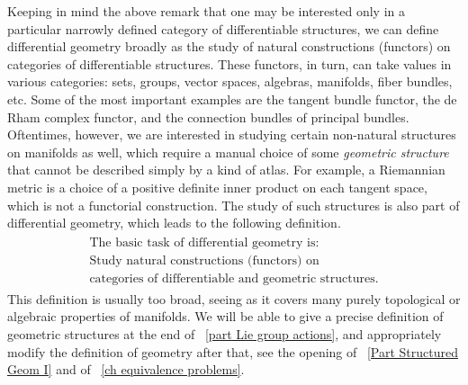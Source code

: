 Keeping in mind the above remark that one may be interested only in a particular narrowly defined category of differentiable structures, we can define differential geometry broadly as the study of natural constructions (functors) on categories of differentiable structures. These functors, in turn, can take values in various categories: sets, groups, vector spaces, algebras, manifolds, fiber bundles, etc. Some of the most important examples are the tangent bundle functor, the de Rham complex functor, and the connection bundles of principal bundles. Oftentimes, however, we are interested in studying certain non-natural structures on manifolds as well, which require a manual choice of some \emph{geometric structure} that cannot be described simply by a kind of atlas. For example, a Riemannian metric is a choice of a positive definite inner product on each tangent space, which is not a functorial construction. The study of such structures is also part of differential geometry, which leads to the following definition.
\begin{gather*}
    \boxed{\begin{array}{c}
    \text{The basic task of differential geometry is:}\\
    \text{Study natural constructions (functors) on}\\
    \text{categories of differentiable and geometric structures.}
    \end{array}}
\end{gather*}
This definition is usually too broad, seeing as it covers many purely topological or algebraic properties of manifolds. We will be able to give a precise definition of geometric structures at the end of \Part~\ref{part Lie group actions}, and appropriately modify the definition of geometry after that, see the opening of \Part~\ref{Part Structured Geom I} and of \Chap~\ref{ch equivalence problems}.

